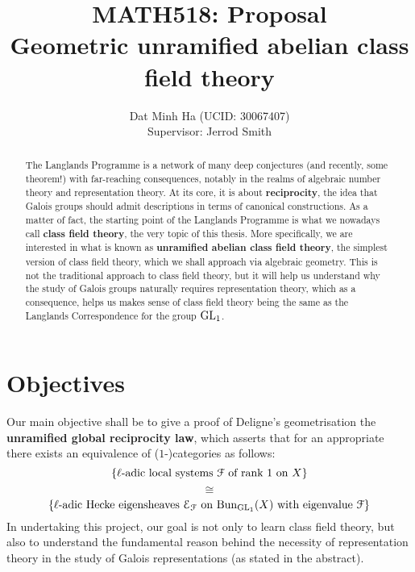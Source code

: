 
\usepackage{soul}





	\title{\textbf{MATH518: Proposal
	\\
	Geometric unramified abelian class field theory}}
	
	\author{Dat Minh Ha (UCID: 30067407)\\Supervisor: Jerrod Smith}
	\maketitle
	
	\begin{abstract}
	    The Langlands Programme is a network of many deep conjectures (and recently, some theorem!) with far-reaching consequences, notably in the realms of algebraic number theory and representation theory. At its core, it is about \textbf{reciprocity}, the idea that Galois groups should admit descriptions in terms of canonical constructions. As a matter of fact, the starting point of the Langlands Programme is what we nowadays call \textbf{class field theory}, the very topic of this thesis. More specifically, we are interested in what is known as \textbf{unramified abelian class field theory}, the simplest version of class field theory, which we shall approach via algebraic geometry. This is not the traditional approach to class field theory, but it will help us understand why the study of Galois groups naturally requires representation theory, which as a consequence, helps us makes sense of class field theory being the same as the Langlands Correspondence for the group $\operatorname{GL}_1$.
	\end{abstract}
	    
	\section{Objectives}
	    Our main objective shall be to give a proof of Deligne's geometrisation the \textbf{unramified global reciprocity law}, which asserts that for an appropriate there exists an equivalence of ($1$-)categories as follows:
	        $$\left\{\text{$\ell$-adic local systems $\mathcal{F}$ of rank $1$ on $X$}\right\}$$
	        $$\cong$$
	        $$\left\{\text{$\ell$-adic Hecke eigensheaves $\mathcal{E}_{\mathcal{F}}$ on $\mathrm{Bun}_{\operatorname{GL}_1}(X)$ with eigenvalue $\mathcal{F}$}\right\}$$
        In undertaking this project, our goal is not only to learn class field theory, but also to understand the fundamental reason behind the necessity of representation theory in the study of Galois representations (as stated in the abstract). 
	
